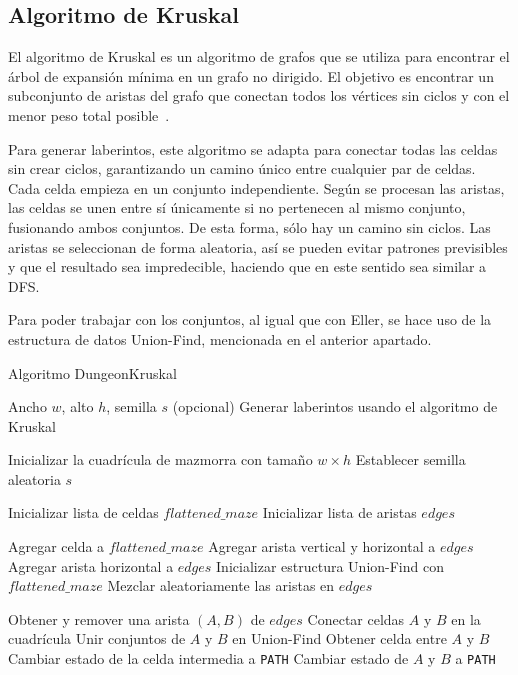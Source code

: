 \subsection{Algoritmo de Kruskal}
El algoritmo de Kruskal es un algoritmo de grafos que se utiliza para encontrar el árbol de expansión mínima en un grafo no dirigido. El objetivo es encontrar un subconjunto de aristas del grafo que conectan todos los vértices sin ciclos y con el menor peso total posible~\cite{MazeGenAnalysis}.

Para generar laberintos, este algoritmo se adapta para conectar todas las celdas sin crear ciclos, garantizando un camino único entre cualquier par de celdas.
Cada celda empieza en un conjunto independiente. Según se procesan las aristas, las celdas se unen entre sí únicamente si no pertenecen al mismo conjunto, fusionando ambos conjuntos. De esta forma, sólo hay un camino sin ciclos. Las aristas se seleccionan de forma aleatoria, así se pueden evitar patrones previsibles y que el resultado sea impredecible, haciendo que en este sentido sea similar a DFS. 

Para poder trabajar con los conjuntos, al igual que con Eller, se hace uso de la estructura de datos Union-Find, mencionada en el anterior apartado.  

\begin{algorithm}
\caption{Algoritmo DungeonKruskal}
\begin{algorithmic}[1]
\Require Ancho $w$, alto $h$, semilla $s$ (opcional)
\Ensure Generar laberintos usando el algoritmo de Kruskal

\State Inicializar la cuadrícula de mazmorra con tamaño $w \times h$
    \State Establecer semilla aleatoria $s$
\EndIf

\State Inicializar lista de celdas $flattened\_maze$
\State Inicializar lista de aristas $edges$

    \State Agregar celda a $flattened\_maze$
\EndFor
{}
        \State Agregar arista vertical y horizontal a $edges$
    \EndFor
\EndFor
{}
    \State Agregar arista horizontal a $edges$
\EndFor
\State Inicializar estructura Union-Find con $flattened\_maze$
\State Mezclar aleatoriamente las aristas en $edges$

    \State Obtener y remover una arista $(A, B)$ de $edges$
        \State Conectar celdas $A$ y $B$ en la cuadrícula
        \State Unir conjuntos de $A$ y $B$ en Union-Find
    \EndIf
\EndWhile
{}
    \State Obtener celda entre $A$ y $B$
    \State Cambiar estado de la celda intermedia a \texttt{PATH}
    \State Cambiar estado de $A$ y $B$ a \texttt{PATH}
\EndProcedure
\end{algorithmic}
\end{algorithm}




